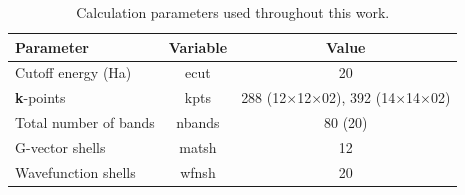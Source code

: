 \documentclass[aps,prb,10pt,superscriptaddress,notitlepage]{revtex4-1}
\begin{document}
\begin{table}
\caption{Calculation parameters used throughout this work.}
\label{tab:params}
\begin{ruledtabular}
\begin{tabular}{ l c c }
Parameter               & Variable  & Value \\
\hline
Cutoff energy (Ha)      & ecut      & 20 \\
\textbf{k}-points       & kpts      & 288 (12$\times$12$\times$02),
                                      392 (14$\times$14$\times$02) \\
Total number of bands   & nbands    & 80 (20) \\
G-vector shells         & matsh     & 12 \\
Wavefunction shells     & wfnsh     & 20
\end{tabular}
\end{ruledtabular}
\end{table}

\end{document}
